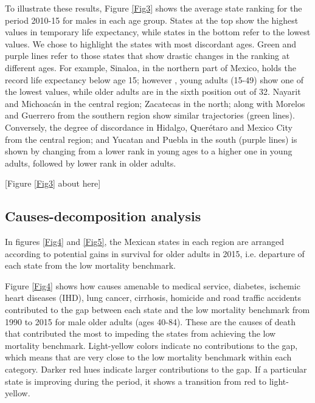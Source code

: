 \documentclass{bmcart}
\begin{document}
To illustrate these results, Figure \ref{Fig3} shows the average state ranking for the period 2010-15 for males in each age group. States at the top show the highest values in temporary life expectancy, while states in the bottom refer to the lowest values. We chose to highlight the states with most discordant ages. Green and purple lines refer to those states that show drastic changes in the ranking at different ages. For example, Sinaloa, in the northern part of Mexico, holds the record life expectancy below age 15; however , young adults (15-49) show one of the lowest values, while older adults are in the sixth position out of 32. Nayarit and Michoac\'an in the central region; Zacatecas in the north; along with Morelos and Guerrero from the southern region show similar trajectories (green lines). Conversely, the degree of discordance in Hidalgo, Quer\'etaro and Mexico City from the central region; and Yucatan and Puebla in the south (purple lines) is shown by changing from a lower rank in young ages to a higher one in young adults, followed by lower rank in older adults. \\

\begin{center}
[Figure \ref{Fig3} about here]
\end{center}


\subsection*{Causes-decomposition analysis}


In figures \ref{Fig4} and \ref{Fig5}, the Mexican states in each region are arranged according to potential gains in survival for older adults in 2015, i.e. departure of each state from the low mortality benchmark. 

Figure \ref{Fig4} shows how causes amenable to medical service, diabetes, ischemic heart diseases (IHD), lung cancer, cirrhosis, homicide and road traffic accidents contributed to the gap between each state and the low mortality benchmark from 1990 to 2015 for male older adults (ages 40-84). These are the causes of death that contributed the most to impeding the states from achieving the low mortality benchmark. Light-yellow colors indicate no contributions to the gap, which means that are very close to the low mortality benchmark within each category. Darker red hues indicate larger contributions to the gap. If a particular state is improving during the period, it shows a transition from red to light-yellow. 
\end{document}
